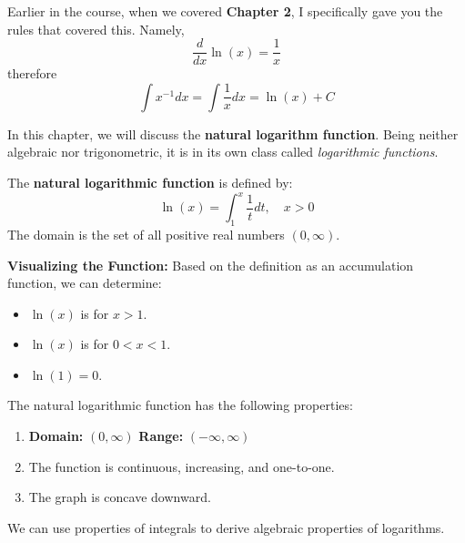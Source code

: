 \documentclass[12pt, letterpaper]{article}
\begin{document}
Earlier in the course, when we covered \textbf{Chapter 2}, I specifically gave you the rules that covered this. Namely, 
$$\frac{d}{dx} \ln(x) = \frac{1}{x}$$ therefore
$$\int x^{-1}dx = \int \frac{1}{x}dx = \ln(x)+C$$ 

In this chapter, we will discuss the \textbf{natural logarithm function}. Being neither algebraic nor trigonometric, it is in its own class called \textit{logarithmic functions}.

\begin{definition}[title=Definition of the Natural Logarithmic Function]
    The \textbf{natural logarithmic function} is defined by:
    \[
    \ln(x) = \int_1^x \frac{1}{t}dt, \quad x>0
    \]
    The domain is the set of all positive real numbers $(0, \infty)$.
\end{definition}

\textbf{Visualizing the Function:}
Based on the definition as an accumulation function, we can determine:
\begin{itemize}
    \item $\ln(x)$ is \underline{\hspace{2cm}} for $x > 1$.
    \item $\ln(x)$ is \underline{\hspace{2cm}} for $0 < x < 1$.
    \item $\ln(1) = 0$.
\end{itemize}

\begin{figure}[H]
    \centering
     

\end{figure}

\begin{theorem}[title=Properties of the Natural Logarithmic Function]
    \tcblower
    The natural logarithmic function has the following properties:
    \begin{enumerate}
        \item \textbf{Domain:} $(0,\infty)$ \quad \textbf{Range:} $(-\infty, \infty)$
        \item The function is continuous, increasing, and one-to-one.
        \item The graph is concave downward.
    \end{enumerate}
\end{theorem}


We can use properties of integrals to derive algebraic properties of logarithms.
\end{document}
